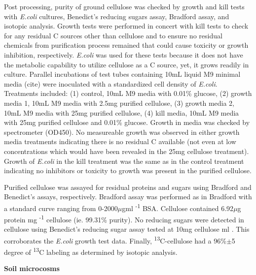 Post processing, purity of ground cellulose was checked by growth and kill tests with \textit{E.coli} cultures, Benedict's reducing sugars assay, Bradford assay, and isotopic analysis. Growth tests were performed in concert with kill tests to check for any residual C sources other than cellulose and to ensure no residual chemicals from purification process remained that could cause toxicity or growth inhibition, respectively. \textit{E.coli} was used for these tests because it does not have the metabolic capability to utilize cellulose as a C source, yet, it grows readily in culture. Parallel incubations of test tubes containing 10mL liquid M9 minimal media (cite) were inoculated with a standardized cell density of \textit{E.coli}. Treatments included: (1) control, 10mL M9 media with 0.01\% glucose, (2) growth media 1, 10mL M9 media with 2.5mg purified cellulose, (3) growth media 2, 10mL M9 media with 25mg purified cellulose, (4) kill media, 10mL M9 media with 25mg purified cellulose and 0.01\% glucose. Growth in media was checked by spectrometer (OD450). No measureable growth was observed in either growth media treatments indicating there is no residual C available (not even at low concentrations which would have been revealed in the 25mg cellulose treatment). Growth of \textit{E.coli} in the kill treatment was the same as in the control treatment indicating no inhibitors or toxicity to growth was present in the purified cellulose.           

Purified cellulose was assayed for residual proteins and sugars using Bradford and Benedict's assays, respectively. Bradford assay was performed as in Bradford \cite{Bradford_1976} with a standard curve ranging from 0-2000$\mu$gml \textsuperscript{-1} BSA. Cellulose contained 6.92$\mu$g protein mg \textsuperscript{-1} cellulose (ie. 99.31\% purity). No reducing sugars were detected in cellulose using Benedict's reducing sugar assay \cite{benedict1909reagent} tested at 10mg cellulose ml . This corroborates the \textit{E.coli} growth test data. Finally, \textsuperscript{13}C-cellulose had a 96\%$\pm$5 degree of \textsuperscript{13}C labeling as determined by isotopic analysis.         




\textbf{Soil microcosms}

